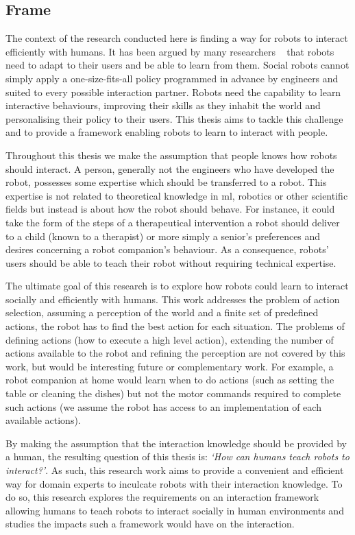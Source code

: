 \subsection{Frame}

The context of the research conducted here is finding a way for robots to interact efficiently with humans. It has been argued by many researchers ~\citep{dautenhahn2004robots,billard2008robot} that robots need to adapt to their users and be able to learn from them. Social robots cannot simply apply a one-size-fits-all policy programmed in advance by engineers and suited to every possible interaction partner. Robots need the capability to learn interactive behaviours, improving their skills as they inhabit the world and personalising their policy to their users. This thesis aims to tackle this challenge and to provide a framework enabling robots to learn to interact with people.

Throughout this thesis we make the assumption that people knows how robots should interact. A person, generally not the engineers who have developed the robot, possesses some expertise which should be transferred to a robot. This expertise is not related to theoretical knowledge in \gls{ml}, robotics or other scientific fields but instead is about how the robot should behave. For instance,  it could take the form of the steps of a therapeutical intervention a robot should deliver to a child (known to a therapist) or more simply a senior's preferences and desires concerning a robot companion's behaviour. As a consequence, robots' users should be able to teach their robot without requiring technical expertise.

The ultimate goal of this research is to explore how robots could learn to interact socially and efficiently with humans. This work addresses the problem of action selection, assuming a perception of the world and a finite set of predefined actions, the robot has to find the best action for each situation. The problems of defining actions (how to execute a high level action), extending the number of actions available to the robot and refining the perception are not covered by this work, but would be interesting future or complementary work. For example, a robot companion at home would learn when to do actions (such as setting the table or cleaning the dishes) but not the motor commands required to complete such actions (we assume the robot has access to an implementation of each available actions).

By making the assumption that the interaction knowledge should be provided by a human, the resulting question of this thesis is: \emph{`How can humans teach robots to interact?'}. As such, this research work aims to provide a convenient and efficient way for domain experts to inculcate robots with their interaction knowledge. To do so, this research explores the requirements on an interaction framework allowing humans to teach robots to interact socially in human environments and studies the impacts such a framework would have on the interaction.

